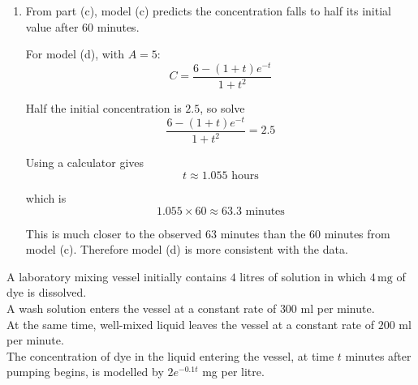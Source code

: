 \documentclass[leqno]{article}
\begin{document}
\begin{enumerate}[
  label=\textbf{\arabic*.},
  leftmargin=*,
  topsep=0pt,
  partopsep=0pt,
  parsep=0pt
]
\begin{djsSolution}
\begin{enumerate}[label=\textbf{(\alph*)}]
  Therefore
  \[
  (1+t^2)C=-(1+t)e^{-t}+K
  \]

  Use \(C(0)=A\):
  \begin{align*}
  (1+0^2)A&=-(1+0)e^{0}+K\\
  A&=-1+K
  \end{align*}

  so
  \[
  K=A+1
  \]

  Hence
  \[
  C=\frac{A+1-(1+t)e^{-t}}{1+t^2}
  \]

  Also, using \(\lim_{t\to\infty}(1+t)e^{-t}=0\):
  \[
  \lim_{t\to\infty}C=\lim_{t\to\infty}\frac{A+1-(1+t)e^{-t}}{1+t^2}=0
  \]

  so this model also has the correct long-term value.

  \item From part (c), model (c) predicts the concentration falls to half its initial value after \(60\) minutes.

  For model (d), with \(A=5\):
  \[
  C=\frac{6-(1+t)e^{-t}}{1+t^2}
  \]

  Half the initial concentration is \(2.5\), so solve
  \[
  \frac{6-(1+t)e^{-t}}{1+t^2}=2.5
  \]

  Using a calculator gives
  \[
  t\approx 1.055 \text{ hours}
  \]

  which is
  \[
  1.055\times 60\approx 63.3 \text{ minutes}
  \]

  This is much closer to the observed \(63\) minutes than the \(60\) minutes from model (c). Therefore model (d) is more consistent with the data.
\end{enumerate}
\end{djsSolution}


\newpage

\questionitem

A laboratory mixing vessel initially contains $4$ litres of solution in which $4\,\mathrm{mg}$ of dye is dissolved. \\

A wash solution enters the vessel at a constant rate of $300$ ml per minute. \\

At the same time, well-mixed liquid leaves the vessel at a constant rate of $200$ ml per minute. \\

The concentration of dye in the liquid entering the vessel, at time $t$ minutes after pumping begins, is modelled by $2e^{-0.1t}$ mg per litre. \\


\end{enumerate}
\end{document}
